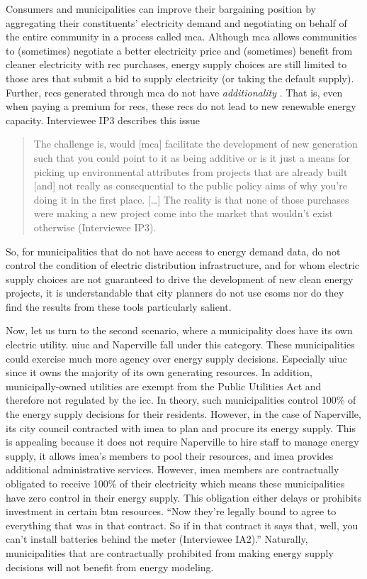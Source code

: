 Consumers and municipalities can improve their bargaining position by
aggregating their constituents' electricity demand and negotiating on behalf of
the entire community in a process called \acf{mca}. Although \ac{mca} allows
communities to (sometimes) negotiate a better electricity price and (sometimes)
benefit from cleaner electricity with \ac{rec} purchases, energy supply choices
are still limited to those \ac{ares} that submit a bid to supply electricity (or
taking the default supply). Further, \acp{rec} generated through \ac{mca} do not
have \textit{additionality} \cite{illinois_power_agency_municipal_2023}. That
is, even when paying a premium for \acp{rec}, these \acp{rec} do not lead to new
renewable energy capacity. Interviewee IP3 describes this issue
\begin{quote}
     The challenge is, would [\ac{mca}] facilitate the development of new
     generation such that you could point to it as being additive or is it just
     a means for picking up environmental attributes from projects that are
     already built [and] not really as consequential to the public policy aims
     of why you're doing it in the first place. [\dots] The reality is that none
     of those purchases were making a new project come into the market that
     wouldn't exist otherwise (Interviewee IP3).
\end{quote}

So, for municipalities that do not have access to energy demand data, do not
control the condition of electric distribution infrastructure, and for whom
electric supply choices are not guaranteed to drive the development of new clean
energy projects, it is understandable that city planners do not use \acp{esom}
nor do they find the results from these tools particularly salient. 

Now, let us turn to the second scenario, where a municipality does have its own
electric utility. \ac{uiuc} and Naperville fall under this category. These
municipalities could exercise much more agency over energy supply decisions.
Especially \ac{uiuc} since it owns the majority of its own generating resources.
In addition, municipally-owned utilities are exempt from the Public Utilities
Act and therefore not regulated by the \ac{icc}. In theory, such municipalities
control 100\% of the energy supply decisions for their residents. However, in
the case of Naperville, its city council contracted with \ac{imea} to plan and
procure its energy supply. This is appealing because it does not require
Naperville to hire staff to manage energy supply, it allows \ac{imea}'s members
to pool their resources, and \ac{imea} provides additional administrative
services. However, \ac{imea} members are contractually obligated to receive
100\% of their electricity which means these municipalities have zero control in
their energy supply. This obligation either delays or prohibits investment in
certain \ac{btm} resources. ``Now they're legally bound to agree to everything
that was in that contract. So if in that contract it says that, well, you can't
install batteries behind the meter (Interviewee IA2).'' Naturally,
municipalities that are contractually prohibited from making energy supply
decisions will not benefit from energy modeling.

